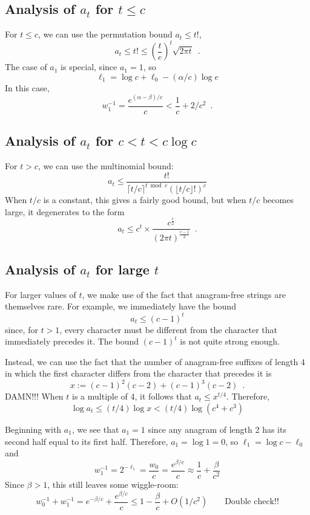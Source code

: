 \documentclass{patmorin}
\newcommand{\ceil}[1]{\lceil #1\rceil}
\newcommand{\floor}[1]{\lfloor #1\rfloor}
\begin{document}
\subsection{Analysis of $a_t$ for $t\le c$}

For $t\le c$, we can use the permutation bound $a_t\le t!$,
\[
   a_t \le t! \le (\frac{t}{e})^t\sqrt{2\pi t} \enspace .
\]
The case of $a_1$ is special, since $a_1=1$, so
\[
   \ell_1 = \log c + \ell_0 - (\alpha/c)\log e
\]
In this case, 
\[
   w_1^{-1} = \frac{e^{(\alpha-\beta)/c}}{c} < \frac{1}{c} + 2/c^2 \enspace .
\]

\subsection{Analysis of $a_t$ for $c < t <c\log c$}

For $t>c$, we can use the multinomial bound:
\[
   a_t \le \frac{t!}{\ceil{t/c}^{t\bmod c}(\floor{t/c}!)^c}
\]
When $t/c$ is a constant, this gives a fairly good bound, but when $t/c$ becomes large, it degenerates to the form
\[
   a_t \le c^t\times \frac{c^{\tfrac{c}{2}}}{(2\pi t)^{\tfrac{c-1}{2}}} \enspace .
\]

\subsection{Analysis of $a_t$ for large $t$}

For larger values of $t$, we make use of the fact that anagram-free strings are themselves rare.  For example, we immediately have the bound
\[
   a_t \le (c-1)^t
 \]
since, for $t>1$, every character must be different from the character that immediately precedes it.  The bound $(c-1)^t$ is not quite strong enough.

Instead, we can use the fact that the number of anagram-free suffixes of length 4 in which the first character differs from the character that precedes it is
\[
  x := (c-1)^2(c-2) + (c-1)^3(c-2) \enspace .
\]
DAMN!!!
When $t$ is a multiple of 4, it follows that $a_t \le x^{t/4}$.
Therefore,
\[
   \log a_t \le (t/4)\log x < (t/4)\log(c^4 + c^3)
\]







Beginning with $a_1$, we see that $a_1=1$ since any anagram of length 2 has its second half equal to its first half.  Therefore, $a_1=\log 1 = 0$, so $\ell_1=\log c - \ell_0$ and 
\[
   w_1^{-1} = 2^{-\ell_1} = \frac{w_0}{c} = \frac{e^{\beta/c}}{c} \approx \frac{1}{c}+\frac{\beta}{c^2}
\]
Since $\beta >1$, this still leaves some wiggle-room:
\[
    w_0^{-1} + w_1^{-1} = e^{-\beta/c} + \frac{e^{\beta/c}}{c}
    \le 1 - \frac{\beta}{c} + O(1/c^2)  \qquad \text{Double check!!}
\]
\end{document}
